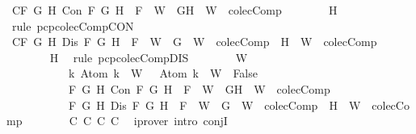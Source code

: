 \begin{isabellebody}
\ C{}{\isacharcolon}{\isachardoublequoteopen}{\isasymforall}F\ G\ H{\isachardot}\ Con\ F\ G\ H\ {\isasymlongrightarrow}\ F\ {\isasymin}\ W\ {\isasymlongrightarrow}\ {\isacharbraceleft}G{\isacharcomma}H{\isacharbraceright}\ {\isasymunion}\ W\ {\isasymin}\ colecComp{\isachardoublequoteclose}\isanewline
\ \ \ \ \ \ \isamarkupfalse%
\ H\ \isamarkupfalse%
\ {\isacharparenleft}rule\ pcp{\isacharunderscore}colecComp{\isacharunderscore}CON{\isacharparenright}\isanewline
\ \ \ \ \isamarkupfalse%
\ C{}{\isacharcolon}{\isachardoublequoteopen}{\isasymforall}F\ G\ H{\isachardot}\ Dis\ F\ G\ H\ {\isasymlongrightarrow}\ F\ {\isasymin}\ W\ {\isasymlongrightarrow}\ {\isacharbraceleft}G{\isacharbraceright}\ {\isasymunion}\ W\ {\isasymin}\ colecComp\ {\isasymor}\ {\isacharbraceleft}H{\isacharbraceright}\ {\isasymunion}\ W\ {\isasymin}\ colecComp{\isachardoublequoteclose}\isanewline
\ \ \ \ \ \ \isamarkupfalse%
\ H\ \isamarkupfalse%
\ {\isacharparenleft}rule\ pcp{\isacharunderscore}colecComp{\isacharunderscore}DIS{\isacharparenright}\isanewline
\ \ \ \ \isamarkupfalse%
\ {\isachardoublequoteopen}{\isasymbottom}\ {\isasymnotin}\ W\isanewline
\ \ \ \ \ \ \ \ \ \ {\isasymand}\ {\isacharparenleft}{\isasymforall}k{\isachardot}\ Atom\ k\ {\isasymin}\ W\ {\isasymlongrightarrow}\ \isactrlbold {\isasymnot}\ {\isacharparenleft}Atom\ k{\isacharparenright}\ {\isasymin}\ W\ {\isasymlongrightarrow}\ False{\isacharparenright}\isanewline
\ \ \ \ \ \ \ \ \ \ {\isasymand}\ {\isacharparenleft}{\isasymforall}F\ G\ H{\isachardot}\ Con\ F\ G\ H\ {\isasymlongrightarrow}\ F\ {\isasymin}\ W\ {\isasymlongrightarrow}\ {\isacharbraceleft}G{\isacharcomma}H{\isacharbraceright}\ {\isasymunion}\ W\ {\isasymin}\ colecComp{\isacharparenright}\isanewline
\ \ \ \ \ \ \ \ \ \ {\isasymand}\ {\isacharparenleft}{\isasymforall}F\ G\ H{\isachardot}\ Dis\ F\ G\ H\ {\isasymlongrightarrow}\ F\ {\isasymin}\ W\ {\isasymlongrightarrow}\ {\isacharbraceleft}G{\isacharbraceright}\ {\isasymunion}\ W\ {\isasymin}\ colecComp\ {\isasymor}\ {\isacharbraceleft}H{\isacharbraceright}\ {\isasymunion}\ W\ {\isasymin}\ colecComp{\isacharparenright}{\isachardoublequoteclose}\isanewline
\ \ \ \ \ \ \isamarkupfalse%
\ C{}\ C{}\ C{}\ C{}\ \isamarkupfalse%
\ {\isacharparenleft}iprover\ intro{\isacharcolon}\ conjI{\isacharparenright}\isanewline
\ \ \isamarkupfalse%
\isanewline
{}\isamarkupfalse%
%
\endisatagproof

\end{isabellebody}

